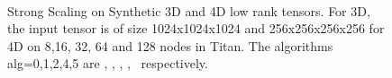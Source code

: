 \begin{figure}
\\
\caption {Strong Scaling on Synthetic 3D and 4D low rank tensors. For 3D, the input tensor is of size 1024x1024x1024 and 256x256x256x256 for 4D on 8,16, 32, 64 and 128 nodes in Titan. The algorithms alg=0,1,2,4,5 are \MU, \HALS, \BPP, \ADMM, \Nestrov\ respectively.}
\label{fig:synstrongscaling}
\end{figure}

